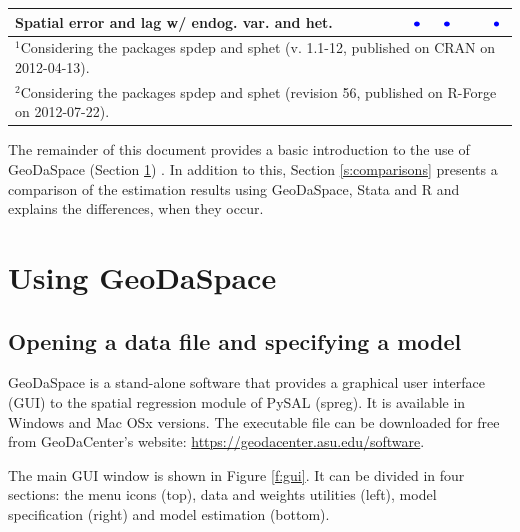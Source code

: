 \documentclass{article}
\begin{document}
\begin{table}[htpb]
\begin{small}
\begin{tabular}{l|cccc}
Spatial error and lag w/ endog. var. and het.&{\LARGE$\textcolor{blue}\bullet$}&{\LARGE$\textcolor{blue}\bullet$}&&{\LARGE$\textcolor{blue}\bullet$}\\
\hline
\multicolumn{5}{l}{\scriptsize{$^1$Considering the packages spdep and sphet (v. 1.1-12, published on CRAN on 2012-04-13).}} \\
\multicolumn{5}{l}{\scriptsize{$^2$Considering the packages spdep and sphet (revision 56, published on R-Forge on 2012-07-22).}} \\
\end{tabular}
\end{small}
\end{table}

The remainder of this document provides a basic introduction to the use of GeoDaSpace (Section \ref{s:GS}) . In addition to this, Section \ref{s:comparisons} presents a comparison of the estimation results using GeoDaSpace, Stata and R and explains the differences, when they occur. 

\newpage
\section{Using GeoDaSpace}
\label{s:GS}
\subsection{Opening a data file and specifying a model}

GeoDaSpace is a stand-alone software that provides a graphical user interface (GUI) to the spatial regression module of PySAL (spreg). It is available in Windows and Mac OSx versions.  The executable file can be downloaded for free from GeoDaCenter's website: \url{https://geodacenter.asu.edu/software}. 

The main GUI window is shown in Figure \ref{f:gui}. It can be divided in four sections: the menu icons (top), data and weights utilities (left), model specification (right) and model estimation (bottom). 
\end{document}
